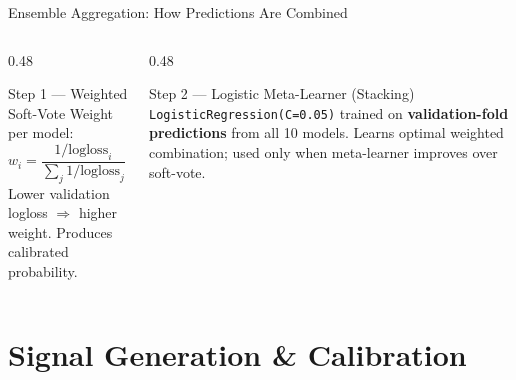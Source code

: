 \documentclass[aspectratio=43,11pt]{beamer}
\begin{document}
\begin{frame}{Ensemble Aggregation: How Predictions Are Combined}
\begin{center}
{
    }
    \end{center}
    \vspace{0.1cm}
    \begin{columns}[T]
        \begin{column}{0.48\textwidth}
            \begin{block}{Step 1 --- Weighted Soft-Vote}
                \footnotesize Weight per model: $w_i = \dfrac{1/\text{logloss}_i}{\sum_j 1/\text{logloss}_j}$ \\[4pt]
                Lower validation logloss $\Rightarrow$ higher weight. Produces calibrated probability.
            \end{block}
        \end{column}
        \begin{column}{0.48\textwidth}
            \begin{block}{Step 2 --- Logistic Meta-Learner (Stacking)}
                \footnotesize \texttt{LogisticRegression(C=0.05)} trained on \textbf{validation-fold predictions} from all 10 models. Learns optimal weighted combination; used only when meta-learner improves over soft-vote.
            \end{block}
        \end{column}
    \end{columns}
\end{frame}

\section{Signal Generation \& Calibration}
\end{document}
